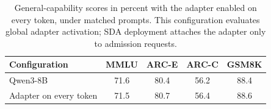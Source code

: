 \begin{table}[tbp]
\centering
\caption{General-capability scores in percent with the adapter enabled on every token, under matched prompts. This configuration evaluates global adapter activation; SDA deployment attaches the adapter only to admission requests.}
\label{tab:adaptercapability}
\small
\setlength{\tabcolsep}{4pt}
\begin{tabular}{lcccc}
\toprule
Configuration & MMLU & ARC-E & ARC-C & GSM8K \\
\midrule
Qwen3-8B & 71.6 & 80.4 & 56.2 & 88.4 \\
Adapter on every token & 71.5 & 80.7 & 56.4 & 88.6 \\
\bottomrule
\end{tabular}

\end{table}
